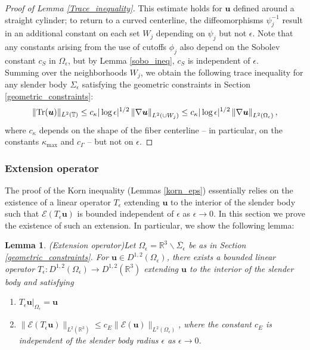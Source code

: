 \documentclass[11pt]{article}
\numberwithin{equation}{section}
\newcommand{\R}{\mathbb{R}}
\newcommand{\T}{\mathbb{T}}
\newcommand{\E}{\mathcal{E}}
\newcommand{\bu}{\bm{u}}
\newcommand{\norm}[1]{\left\lVert #1 \right\rVert}
\newtheorem{lemma}[theorem]{Lemma}
\theoremstyle{definition}
\begin{document}
\begin{proof}[Proof of Lemma \ref{Trace_inequality}]
This estimate holds for $\bu$ defined around a straight cylinder; to return to a curved centerline, the diffeomorphisms $\psi_j^{-1}$ result in an additional constant on each set $W_j$  depending on $\psi_j$ but not $\epsilon$. Note that any constants arising from the use of cutoffs $\phi_j$ also depend on the Sobolev constant $c_S$ in $\Omega_\epsilon$, but by Lemma \ref{sobo_ineq}, $c_S$ is independent of $\epsilon$. \\

Summing over the neighborhoods $W_j$, we obtain the following trace inequality for any slender body $\Sigma_{\epsilon}$ satisfying the geometric constraints in Section \ref{geometric_constraints}:
\begin{equation}\label{trace_const0} 
\|{\rm Tr}(\bu)\|_{L^2(\T)} \le c_{\kappa}|\log\epsilon|^{1/2}\norm{\nabla\bu}_{L^2(\cup W_j)} \le c_{\kappa}|\log\epsilon|^{1/2}\norm{\nabla\bu}_{L^2(\Omega_\epsilon)},
\end{equation}
where $c_{\kappa}$ depends on the shape of the fiber centerline -- in particular, on the constants $\kappa_{\max}$ and $c_\Gamma$ -- but not on $\epsilon$. 
\end{proof}

\subsubsection{Extension operator}\label{extension}
The proof of the Korn inequality (Lemmas \ref{korn_eps}) essentially relies on the existence of a linear operator $T_{\epsilon}$ extending $\bu$ to the interior of the slender body such that $\E(T_{\epsilon}\bu)$ is bounded independent of $\epsilon$ as $\epsilon\to 0$. In this section we prove the existence of such an extension. In particular, we show the following lemma:
\begin{lemma}\emph{(Extension operator)}\label{extension_eps}
Let $\Omega_{\epsilon}=\R^3 \backslash \overline{\Sigma_{\epsilon}}$ be as in Section \ref{geometric_constraints}. For $\bu\in D^{1,2}(\Omega_{\epsilon})$, there exists a bounded linear operator $T_{\epsilon}: D^{1,2}(\Omega_{\epsilon})\to D^{1,2}(\R^3)$ extending $\bu$ to the interior of the slender body and satisfying 
\begin{enumerate}
\item $T_{\epsilon}\bu|_{\Omega_{\epsilon}} = \bu$ 
\item $\|\E(T_{\epsilon}\bu) \|_{L^2(\R^3)} \le c_E \| \E(\bu)\|_{L^2(\Omega_{\epsilon})}$, where the constant $c_E$ is independent of the slender body radius $\epsilon$ as $\epsilon\to 0$.
\end{enumerate}
\end{lemma}
\end{document}
